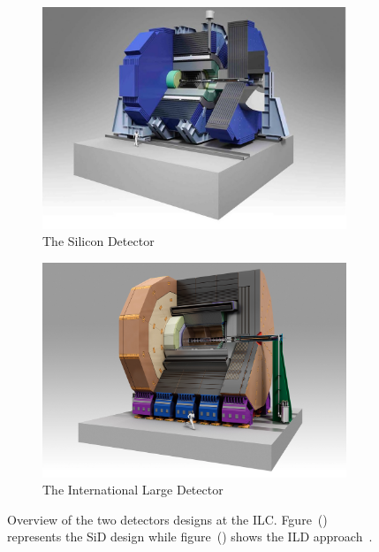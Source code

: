     \begin{figure}[!h]
      \centering
      \begin{subfigure}[t]{0.5\textwidth}
        \includegraphics[width = \textwidth]{Pictures/ILC/SiD.jpg}
        \caption{\label{fig:SiD} The Silicon Detector}
      \end{subfigure}
      \begin{subfigure}[t]{0.5\textwidth}
        \includegraphics[width = 1.03\textwidth]{Pictures/ILC/ILD.jpg}
        \caption{\label{fig:ILD} The International Large Detector}
      \end{subfigure}
    \caption{Overview of the two detectors designs at the ILC. Fgure~() represents the SiD design while figure~() shows the ILD approach~\cite{Behnke2010}.}
      \label{fig:Detectors}
    \end{figure}    

